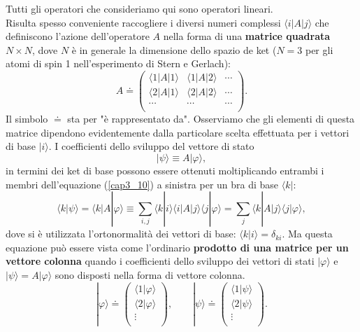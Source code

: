 Tutti gli operatori che consideriamo qui sono operatori lineari.\\
Risulta spesso conveniente raccogliere i diversi numeri complessi $\langle i | A | j \rangle$ che definiscono l'azione dell'operatore $A$ nella forma di una \textbf{matrice quadrata} $N\times N$, dove $N$ è in generale la dimensione dello spazio de ket ($N=3$ per gli atomi di spin 1 nell'esperimento di Stern e Gerlach):
	\begin{equation}
		\boxed{
			A \doteq
			\begin{pmatrix}
			\langle 1 | A  | 1 \rangle & \langle 1 | A  | 2 \rangle & \cdots\\
			\langle 2 | A  | 1 \rangle & \langle 2 | A  | 2 \rangle & \cdots \\
\cdots & \cdots & \cdots \\
			\end{pmatrix} .
			}
	\end{equation}
Il simbolo $\doteq$ sta per "è rappresentato da".
Osserviamo che gli elementi di questa matrice dipendono evidentemente dalla particolare scelta effettuata per i vettori di base $| i \rangle$.
I coefficienti dello sviluppo del vettore di stato
	\begin{equation}
		| \psi \rangle \equiv A | \varphi \rangle ,
	\end{equation}
in termini dei ket di base possono essere ottenuti moltiplicando entrambi i membri dell'equazione (\ref{cap3_10}) a sinistra per un bra di base $\langle k | $:
	\begin{equation}
		\langle k | \psi \rangle = \langle k | A | \varphi \rangle \equiv \sum \limits_{i,j} \langle k | i \rangle \langle i | A | j\rangle \langle j | \varphi \rangle = \sum \limits_{j} \langle k | A | j \rangle \langle j | \varphi \rangle ,
	\end{equation}
dove si è utilizzata l'ortonormalità dei vettori di base: $\langle k | i \rangle =\delta_{ki}$. Ma questa equazione può essere vista come l'ordinario \textbf{prodotto di una matrice per un vettore colonna} quando i coefficienti dello sviluppo dei vettori di stati $| \varphi \rangle$ e $| \psi \rangle =A | \varphi \rangle$ sono disposti nella forma di vettore colonna.
	\begin{equation}
		\boxed{
			| \varphi \rangle \doteq 
			\begin{pmatrix}
			\langle 1 | \varphi \rangle \\
			\langle 2 | \varphi \rangle \\
			\vdots \\
			\end{pmatrix}, \qquad
			| \psi \rangle \doteq 
			\begin{pmatrix}
			\langle 1 | \psi \rangle \\
			\langle 2 | \psi \rangle \\
			\vdots \\
			\end{pmatrix} .
			}
	\end{equation}


